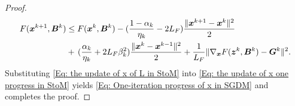 \begin{proof}
\begin{align}
        F(\bm{x}^{k+1}, \bm{B}^{k}) & \leq F(\bm{x}^{k}, \bm{B}^{k}) - (\frac{1 - \alpha_{k}}{\eta_{k}}- 2L_{F})\frac{\|\bm{x}^{k+1}- \bm{x}^{k}\|^{2}}{2}\notag                                                                                           \\
                                 & +\,(\frac{\alpha_{k}}{\eta_{k}}+ 2L_{F}\beta_{k}^{2})\frac{\|\bm{x}^{k}- \bm{x}^{k-1}\|^{2}}{2}+ \frac{1}{L_{F}}\|\nabla_{\bm{x}}F(\bm{z}^{k}, \bm{B}^{k}) - \bm{G}^{k}\|^{2}. \label{Eq: the update of x of L in StoM}
    \end{align}
    Substituting \eqref{Eq: the update of x of L in StoM} into \eqref{Eq: the update of x one progress in StoM}
    yields \eqref{Eq: One-iteration progress of x in SGDM} and completes the proof.
    
\end{proof}
